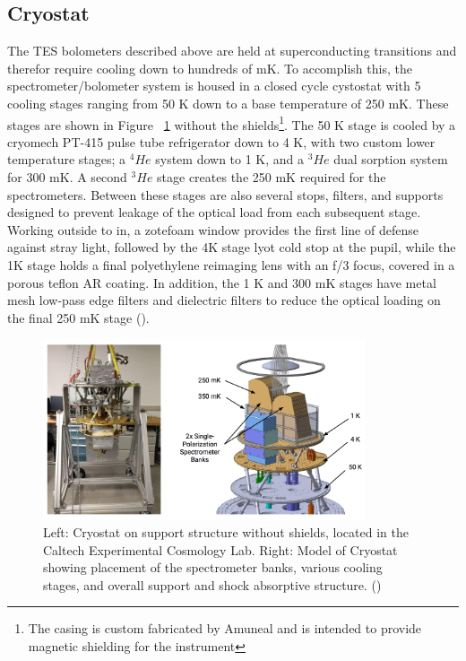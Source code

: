 \documentclass[manuscript]{aastex}
\begin{document}
\subsection{\textbf{Cryostat}}
The TES bolometers described above are held at superconducting transitions and therefor require cooling down to hundreds of mK. To accomplish this, the spectrometer/bolometer system is housed in a closed cycle cystostat with 5 cooling stages ranging from 50 K down to a base temperature of 250 mK. These stages are shown in Figure ~\ref{fig:jon1} without the shields\footnote{The casing is custom fabricated by {\sc Amuneal} and is intended to provide magnetic shielding for the instrument}. The 50 K stage is cooled by a cryomech PT-415 pulse tube refrigerator down to 4 K, with two custom lower temperature stages; a \(^{4}He\) system down to 1 K, and a \(^{3}He\) dual sorption system for 300 mK. A second \(^{3}He\) stage creates the 250 mK required for the spectrometers. Between these stages are also several stops, filters, and supports designed to prevent leakage of the optical load from each subsequent stage. Working outside to in, a zotefoam window provides the first line of defense against stray light, followed by the 4K stage lyot cold stop at the pupil, while the 1K stage holds a final polyethylene reimaging lens with an f/3 focus, covered in a porous teflon AR coating. In addition, the 1 K and 300 mK stages have metal mesh low-pass edge filters and dielectric filters to reduce the optical loading on the final 250 mK stage (\cite{Crites2014}).

\begin{figure}[H]
\centering
\captionsetup{width=0.85\textwidth}
\includegraphics[width=0.85\textwidth]{jon1.png}
\caption[TIME Cryostat -(\cite{Hunacek2016})]{Left: Cryostat on support structure without shields, located in the Caltech Experimental Cosmology Lab. Right: Model of Cryostat showing placement of the spectrometer banks, various cooling stages, and overall support and shock absorptive structure. (\cite{Hunacek2016})}
\label{fig:jon1}
\end{figure}
\end{document}
